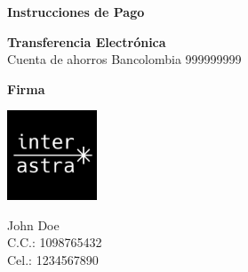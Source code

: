 \documentclass{letter}
\begin{document}
\vspace{1 cm}

\Large\textbf{Instrucciones de Pago}\normalsize

\vspace{0.1 cm}

\textbf{Transferencia Electrónica}\\
Cuenta de ahorros Bancolombia 999999999

\textbf{Firma}

\includegraphics[width=0.2\textwidth]{logo.png}

John Doe\\
C.C.: 1098765432\\
Cel.: 1234567890
\end{document}
